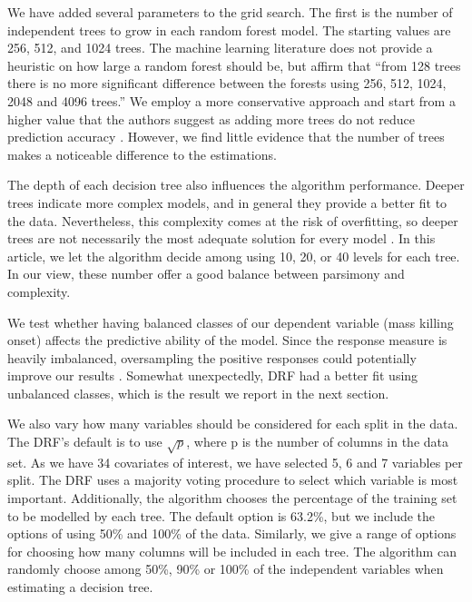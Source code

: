 We have added several parameters to the grid search. The first is the number of independent trees to grow in each random forest model. The starting values are 256, 512, and 1024 trees. The machine learning literature does not provide a heuristic on how large a random forest should be, but \citet[166]{oshiro2012many} affirm that ``from 128 trees there is no more significant difference between the forests using 256, 512, 1024, 2048 and 4096 trees.'' We employ a more conservative approach and start from a higher value that the authors suggest as adding more trees do not reduce prediction accuracy \citep[7]{breiman2001statistical}. However, we find little evidence that the number of trees makes a noticeable difference to the estimations.

The depth of each decision tree also influences the algorithm performance. Deeper trees indicate more complex models, and in general they provide a better fit to the data. Nevertheless, this complexity comes at the risk of overfitting, so deeper trees are not necessarily the most adequate solution for every model \citep[596]{friedman2001greedy,segal2004machine}. In this article, we let the algorithm decide among using 10, 20, or 40 levels for each tree. In our view, these number offer a good balance between parsimony and complexity.

We test whether having balanced classes of our dependent variable (mass killing onset) affects the predictive ability of the model. Since the response measure is heavily imbalanced, oversampling the positive responses could potentially improve our results \citep{chawla2004special,del2014use,japkowicz2002class}. Somewhat unexpectedly, DRF had a better fit using unbalanced classes, which is the result we report in the next section.

We also vary how many variables should be considered for each split in the data. The DRF's default is to use $\sqrt{p}$, where p is the number of columns in the data set. As we have 34 covariates of interest, we have selected 5, 6 and 7 variables per split. The DRF uses a majority voting procedure to select which variable is most important. Additionally, the algorithm chooses the percentage of the training set to be modelled by each tree. The default option is 63.2\%, but we include the options of using 50\% and 100\% of the data. Similarly, we give a range of options for choosing how many columns will be included in each tree. The algorithm can randomly choose among 50\%, 90\% or 100\% of the independent variables when estimating a decision tree.

